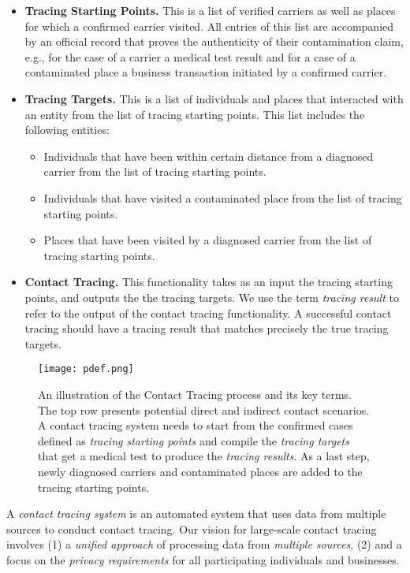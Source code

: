\begin{itemize}
    \item \textbf{Tracing Starting Points.} This is a list of verified carriers as well as places for which a confirmed carrier visited. All entries of this list are accompanied by an official record that proves the authenticity of their contamination claim, e.g., for the case of a carrier a medical test result and for a case of a contaminated place a business transaction initiated by a confirmed carrier. 
    \item \textbf{Tracing Targets.} This is a list of individuals and places that interacted with an entity from the list of tracing starting points. This list includes the following entities:
    \begin{itemize}
        \item Individuals that have been within certain distance from a diagnosed carrier from the list of tracing starting points.
        \item Individuals that have visited a contaminated place from the list of tracing starting points.
        \item Places that have been visited by a diagnosed carrier from the list of tracing starting points.
    \end{itemize}
    \item \textbf{Contact Tracing.} This functionality takes as an input the tracing starting points, and outputs the the tracing targets. We use the term \emph{tracing result} to refer to the output of the contact tracing functionality. A successful contact tracing should have a tracing result that matches precisely the true tracing targets.
\end{itemize}

\begin{figure}
\centering
\texttt{[image: pdef.png]}
\caption{An illustration of the Contact Tracing process and its key terms. The top row presents potential direct and indirect contact scenarios. 
A contact tracing system needs to start from the confirmed cases defined as \emph{tracing starting points} and  compile the \emph{tracing targets} that get a medical test to produce the \emph{tracing results}. As a last step, newly diagnosed carriers and contaminated places are added to the tracing starting points.}
\label{problemdef}
\end{figure}

A \emph{contact tracing system} is an automated system that uses data from multiple sources to conduct contact tracing. Our vision for large-scale contact tracing involves (1) a \emph{unified approach} of processing data from \emph{multiple sources}, (2) and a focus on the  \emph{privacy requirements} for all participating individuals and businesses.

